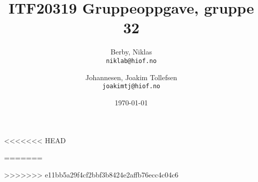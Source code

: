 \documentclass{article}
\date{\today}
\author{
Berby, Niklas\\
\texttt{niklab@hiof.no}
\and
Johannesen, Joakim Tollefsen\\
\texttt{joakimtj@hiof.no}
}
\title{ITF20319 Gruppeoppgave, gruppe 32}
\begin{document}
\maketitle
\tableofcontents
\newpage








<<<<<<< HEAD

=======

>>>>>>> e11bb5a29f4cf2bbf3b8424e2affb76ecc4c04c6
\end{document}

